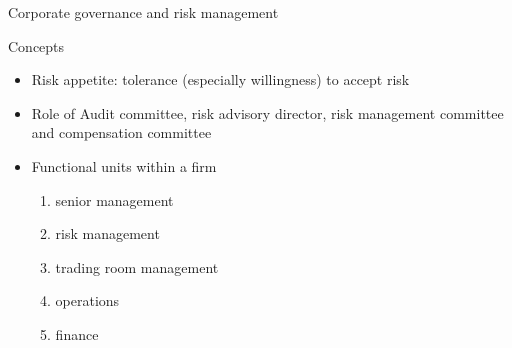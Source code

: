 \begin{frame}[allowframebreaks]{Corporate governance and risk management}
\begin{block}{Concepts}
	\begin{itemize}
		\item Risk appetite: tolerance (especially willingness) to accept risk
		\item Role of Audit committee, risk advisory director, risk management committee and compensation committee
		\item Functional units within a firm 
		\begin{enumerate}
			\item senior management
			\item risk management
			\item trading room management
			\item operations
			\item finance
		\end{enumerate}
	\end{itemize}
\end{block}

\end{frame}




